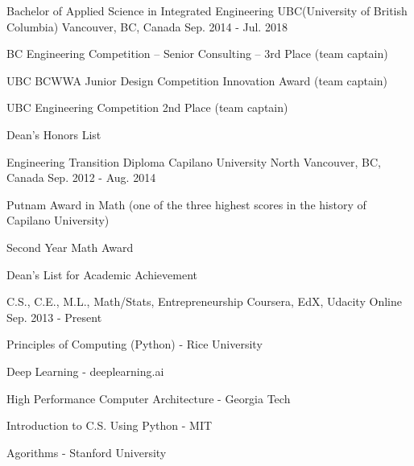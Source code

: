 

\begin{cventries}

  \cventry
    {Bachelor of Applied Science in Integrated Engineering} %
    {UBC(University of British Columbia)} %
    {Vancouver, BC, Canada} %
    {Sep. 2014 - Jul. 2018} %
    {
      \begin{cvitems} %
        \item {BC Engineering Competition – Senior Consulting – 3rd Place (team captain)}
        \item {UBC BCWWA Junior Design Competition Innovation Award (team captain)}
        \item {UBC Engineering Competition 2nd Place (team captain)}
        \item {Dean's Honors List}
      \end{cvitems}
    }

  \cventry
    {Engineering Transition Diploma} %
    {Capilano University} %
    {North Vancouver, BC, Canada} %
    {Sep. 2012 - Aug. 2014} %
    {
      \begin{cvitems} %
        \item {Putnam Award in Math (one of the three highest scores in the history of Capilano University)}
        \item {Second Year Math Award}
        \item {Dean’s List for Academic Achievement}
      \end{cvitems}
    }

  \cventry
    {C.S., C.E., M.L., Math/Stats, Entrepreneurship} %
    {Coursera, EdX, Udacity} %
    {Online} %
    {Sep. 2013 - Present} %
    {
      \begin{cvitems} %
        \item {Principles of Computing (Python) - Rice University}
        \item {Deep Learning - deeplearning.ai}
        \item {High Performance Computer Architecture - Georgia Tech}
        \item Introduction to C.S. Using Python - MIT
        \item {Agorithms - Stanford University}
      \end{cvitems}
    }

\end{cventries}

